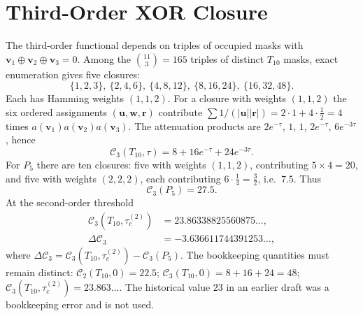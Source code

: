 \documentclass[10pt,twocolumn]{article}
\theoremstyle{definition}
\newcommand{\Tten}{T_{10}}
\newcommand{\Pfive}{P_5}
\newcommand{\tauc}{\tau_c^{(2)}}
\begin{document}
\section{Third-Order XOR Closure}
The third-order functional depends on triples of occupied masks with $\mathbf v_1\oplus\mathbf v_2\oplus\mathbf v_3=0$. Among the $\binom{11}{3}=165$ triples of distinct $\Tten$ masks, exact enumeration gives five closures:
\begin{equation}
\{1,2,3\},\ \{2,4,6\},\ \{4,8,12\},\ \{8,16,24\},\ \{16,32,48\}.\label{eq:xor}
\end{equation}
Each has Hamming weights $(1,1,2)$. For a closure with weights $(1,1,2)$ the six ordered assignments $(\mathbf u,\mathbf w,\mathbf r)$ contribute $\sum1/(|\mathbf u||\mathbf r|)=2\cdot1+4\cdot\tfrac12=4$ times $a(\mathbf v_1)a(\mathbf v_2)a(\mathbf v_3)$. The attenuation products are $2e^{-\tau}$, $1$, $1$, $2e^{-\tau}$, $6e^{-3\tau}$, hence
\begin{equation}
\mathcal C_3(\Tten,\tau)=8+16e^{-\tau}+24e^{-3\tau}. \label{eq:C3T}
\end{equation}
For $\Pfive$ there are ten closures: five with weights $(1,1,2)$, contributing $5\times4=20$, and five with weights $(2,2,2)$, each contributing $6\cdot\tfrac14=\tfrac32$, i.e.\ $7.5$. Thus
\begin{equation}
\mathcal C_3(\Pfive)=27.5. \label{eq:C3P}
\end{equation}
At the second-order threshold
\begin{align}
\mathcal C_3(\Tten,\tauc)&=23.86338825560875\ldots,\\
\Delta\mathcal C_3&=-3.636611744391253\ldots,\label{eq:dC3}
\end{align}
where $\Delta\mathcal C_3=\mathcal C_3(\Tten,\tauc)-\mathcal C_3(\Pfive)$.
The bookkeeping quantities must remain distinct: $\mathcal C_2(\Tten,0)=22.5$; $\mathcal C_3(\Tten,0)=8+16+24=48$; $\mathcal C_3(\Tten,\tauc)=23.863\ldots$. The historical value $23$ in an earlier draft was a bookkeeping error and is not used.

\end{document}
